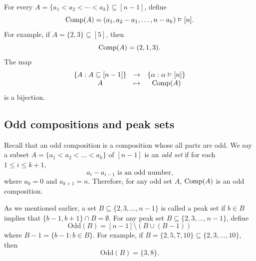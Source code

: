 \documentclass[11pt]{amsart}
\numberwithin{equation}{section}
\newcommand{\odd}{\mathrm{Odd}}
\begin{document}
 
For every $A=\{a_1<a_2<\cdots<a_k\}\subseteq [n-1]$, define  
 \[ {\rm Comp}(A)=(a_1,a_2-a_1,\dots, n-a_k)\vDash [n]. \]
% 
  For example,  if $A=\{2,3\}\subseteq [5]$, then \[{\rm Comp}(A)=(2,1,3).\] The map 
  \[
  \begin{array}{ccc}
  \{A: A\subseteq[n-1]\} & \rightarrow & \{\alpha: \alpha\vDash[n]\}\\
  A& \mapsto&  {\rm Comp}(A)
  \end{array} 
  \]
  is a bijection. 
  
%

\subsection{Odd compositions and peak sets}
 Recall that an odd composition is a composition whose all parts are odd.  We say a subset $A=\{a_1<a_2< \dots< a_k\}$ of $[n-1]$ is an \emph{odd set} if for each $1\leq i\leq k+1$, 
$$a_i-a_{i-1} \text{~is an odd number,}$$
where $a_0=0$ and $a_{k+1}=n.$  Therefore, for any odd set $A$, ${\rm Comp}(A)$ is an odd composition. 



 As we mentioned earlier, a set $B\subseteq \{2,3,\dots,n-1\}$ is called a {peak set}  if $b\in B$ implies that $\{b-1,b+1\}\cap B=\emptyset$.  For any peak set $B\subseteq \{2,3,\dots,n-1\}$, define
$${\odd}(B)=[n-1]\setminus (B\cup (B-1))$$ where $B-1=\{b-1:b\in B\}.$ 
For example, if $B=\{2,5,7,10\}\subseteq \{2,3,\dots, 10\}$, then \[\odd(B)=\{3,8\}.\]

\end{document}

